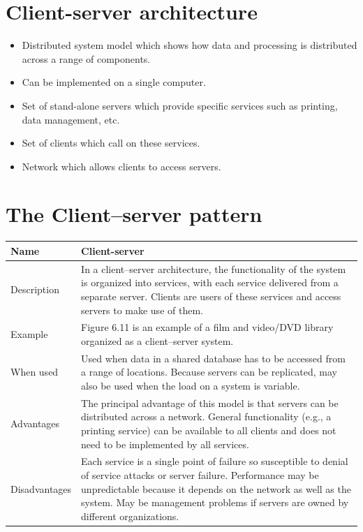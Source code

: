 \section{Client-server architecture}
\begin{itemize}

\item Distributed system model which shows how data and processing is distributed across a range of components.

 \item Can be implemented on a single computer.

\item Set of stand-alone servers which provide specific services such as printing, data management, etc.

\item Set of clients which call on these services. \item Network which allows clients to access servers.

\end{itemize}
\section{The Client–server pattern}

\begin{table}[h!]
\centering
\begin{tabular}{ |p{3cm}|p{8cm}|  }
\hline
Name & Client-server\\
\hline
\hline
Description & In a client–server architecture, the functionality of the system is organized into services, with each service delivered from a separate server. Clients are users of these services and access servers to make use of them.\\
\hline
Example & Figure 6.11 is an example of a film and video/DVD library organized as a client–server system.\\
\hline
When used & Used when data in a shared database has to be accessed from a range of locations. Because servers can be replicated, may also be used when the load on a system is variable.\\
\hline
Advantages & The principal advantage of this model is that servers can be distributed across a network. General functionality (e.g., a printing service) can be available to all clients and does not need to be implemented by all services.\\
\hline
Disadvantages & Each service is a single point of failure so susceptible to denial of service attacks or server failure. Performance may be unpredictable because it depends on the network as well as the system. May be management problems if servers are owned by different organizations.\\
\hline
\end{tabular}

\label{table:T2_3}
\end{table}
\newpage
